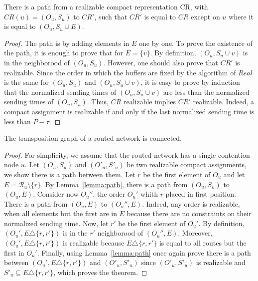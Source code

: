 \documentclass[english]{article}
\begin{document}


\begin{lemma}\label{lemma:path}
There is a path from a realizable compact representation CR, with $CR(u) = (O_u,S_u)$ to $CR'$, such that 
$CR'$ is equal to $CR$ except on $u$ where it is equal to $(O_u,S_u \cup E)$.  
\end{lemma}
\begin{proof}
The path is by adding elements in $E$ one by one. 
 To prove the existence of the path, it is enough to prove that for  $E = \{v\}$. By definition, $(O_u,S_u \cup{v})$ is in the neighborood of $(O_u,S_u)$. However, one should also prove that $CR'$ is realizable.
  Since the order in which the buffers are fixed by the algorithm of $Real$ is the same for $(O_u,S_u)$ and $(O_u,S_u \cup{v})$, it is easy to prove by induction that the normalized sending times of $(O_u,S_u \cup{v})$ are less than the normalized sending times of $(O_u,S_u)$. Thus, $CR$ realizable implies $CR'$ realizable. Indeed, 
a compact assignment is realizable if and only if the last normalized sending time is less than $P - \tau$.
\end{proof}



 \begin{theorem}
 The transposition graph of a routed network is connected.
 \end{theorem}
 \begin{proof}
 For simplicity, we assume that the routed network has a single contention node $u$. Let $(O_u,S_u)$ and $(O'_u,S'_u)$ be two realizable compact assignments, we show there is a path between them. Let $r$ be the first element of 
$O_u$ and let $E = \mathcal{R}_u \setminus \{ r \}$. By Lemma~\ref{lemma:path}, there is a path from 
$(O_u,S_u)$ to $(O_u,E)$. Consider now $O_u''$, the order $O_u'$ whith $r$ placed in first position.
There is a path from $(O_u,E)$ to $(O_u'',E)$. Indeed, any order is realizable, when all elements but the first
are in $E$ because there are no constraints on their normalized sending time. 
Now, let $r'$ be the first element of $O_u'$. By definition, $(O_u',E \triangle \{r,r'\})$ is in the $r'$ neighborood of $(O_u'',E)$. Moreover, $(O_u',E \triangle \{r,r'\})$ is realizable because $E \triangle \{r,r'\}$ is equal to all routes but the first in $O_u'$. 
Finally, using Lemma~\ref{lemma:path} once again prove there is a path between $(O_u',E \triangle \{r,r'\})$ and $(O'_u,S'_u)$ since $(O'_u,S'_u)$ is realizable and $S'_u \subseteq E \triangle \{r,r'\}$, which proves the theorem.
 \end{proof}
\end{document}
